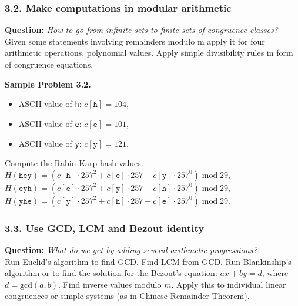 \documentclass[jou]{apa6}
\begin{document}
\subsubsection{3.2. Make computations in modular arithmetic}

{\bf Question:} {\em How to go from infinite sets to finite sets of congruence classes?}\\
{\scriptsize 
Given some statements involving remainders modulo m apply it for four 
arithmetic operations, polynomial values. 
Apply simple divisibility rules in form of congruence equations. 
}


\vspace{6pt}
{\bf Sample Problem 3.2.}
\begin{itemize}
\item ASCII value of {\tt h}: $c[\mathtt{h}]=104$,
\item ASCII value of {\tt e}: $c[\mathtt{e}]=101$,
\item ASCII value of {\tt y}: $c[\mathtt{y}]=121$.
\end{itemize}

Compute the Rabin-Karp hash values:\\
$H(\mathtt{hey}) = (c[\mathtt{h}] \cdot 257^2 + c[\mathtt{e}] \cdot 257 + c[\mathtt{y}] \cdot 257^0)\;\text{mod}\;29$,\\
$H(\mathtt{eyh}) = (c[\mathtt{e}] \cdot 257^2 + c[\mathtt{y}] \cdot 257 + c[\mathtt{h}] \cdot 257^0)\;\text{mod}\;29$,\\
$H(\mathtt{yhe}) = (c[\mathtt{y}] \cdot 257^2 + c[\mathtt{h}] \cdot 257 + c[\mathtt{e}] \cdot 257^0)\;\text{mod}\;29$.




\subsubsection{3.3. Use GCD, LCM and Bezout identity}

{\bf Question:} {\em What do we get by adding several arithmetic progressions?}\\
{\scriptsize 
Run Euclid’s algorithm to find GCD. Find LCM from GCD. Run Blankinship’s algorithm 
or to find the solution for the Bezout’s equation: $ax + by = d$, where $d = \text{gcd}(a,b)$. 
Find inverse values modulo $m$. Apply this to individual linear congruences 
or simple systems (as in Chinese Remainder Theorem).
}
\end{document}
